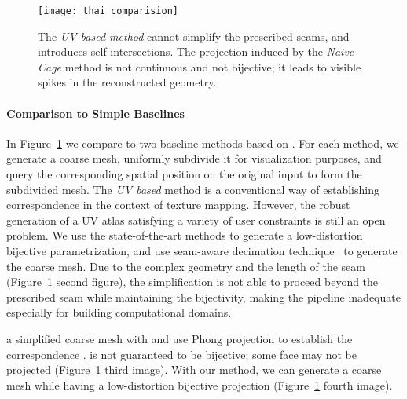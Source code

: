 \begin{figure}
    \centering
    \texttt{[image: thai\_comparision]}
    \caption{The \emph{UV based method} cannot simplify the prescribed seams, and introduces self-intersections. 
    The projection induced by the \emph{Naive Cage} method is not continuous and not bijective; it leads to visible spikes in the reconstructed geometry.}
    \label{fig:qslim_naive}
    
\end{figure}

\paragraph{Comparison to Simple Baselines}
In Figure~\ref{fig:qslim_naive} we compare to two baseline methods based on \cite{garland1998simplifying}. For each method, we generate a coarse mesh, uniformly subdivide it for visualization purposes, 
and query the corresponding spatial position on the original input to form the subdivided mesh.
The \emph{UV based} method is a conventional way of establishing correspondence in the context of texture mapping. However, the robust generation of a UV atlas satisfying a variety of user constraints is still an open problem. We use the state-of-the-art methods \cite{li2018optcuts,jiang2017simplicial} to generate a low-distortion bijective parametrization, and use seam-aware decimation technique~\cite{liu2017seamless} to generate the coarse mesh.
Due to the complex geometry and the length of the seam (Figure~\ref{fig:qslim_naive} second figure), the simplification is not able to proceed beyond the prescribed seam while maintaining the bijectivity, making the pipeline inadequate especially for building computational domains. 

 a simplified coarse mesh with \cite{garland1998simplifying} and use Phong projection to establish the correspondence \cite{kobbelt1998interactive,panozzo2013weighted}.  is not guaranteed to be bijective; some face may not be projected (Figure~\ref{fig:qslim_naive} third image). With our method, we can generate a coarse mesh while having a low-distortion bijective projection (Figure~\ref{fig:qslim_naive} fourth image).

